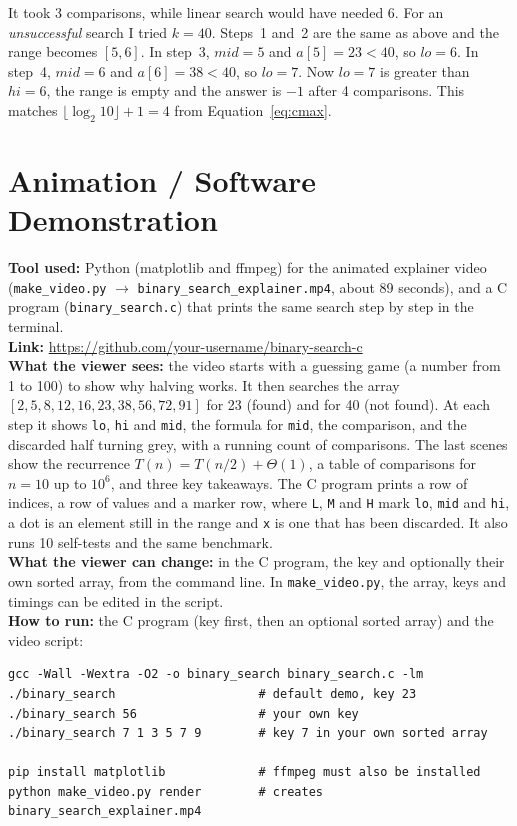 \documentclass[11pt,a4paper]{article}
\newcommand{\animationlink}{https://github.com/your-username/binary-search-c}
\newif\ifshowguidance
\newcommand{\guidance}[1]{\ifshowguidance\begin{guidancebox}#1\end{guidancebox}\fi}
\begin{document}
It took 3 comparisons, while linear search would have needed 6. For an
\emph{unsuccessful} search I tried $k=40$. Steps~1 and~2 are the same as above
and the range becomes $[5,6]$. In step~3, $\mathit{mid}=5$ and $a[5]=23<40$, so
$\mathit{lo}=6$. In step~4, $\mathit{mid}=6$ and $a[6]=38<40$, so
$\mathit{lo}=7$. Now $\mathit{lo}=7$ is greater than $\mathit{hi}=6$, the range is
empty and the answer is $-1$ after 4 comparisons. This matches
$\lfloor\log_2 10\rfloor+1=4$ from Equation~\eqref{eq:cmax}.

\section{Animation / Software Demonstration}
\guidance{Compulsory: tool, link, how to run, 3--4 key frames.}

\textbf{Tool used:} Python (matplotlib and ffmpeg) for the animated explainer video
(\texttt{make\_video.py} $\rightarrow$ \texttt{binary\_search\_explainer.mp4}, about
89 seconds), and a C program (\texttt{binary\_search.c}) that prints the same search
step by step in the terminal.\\
\textbf{Link:} \url{\animationlink}\\
\textbf{What the viewer sees:} the video starts with a guessing game (a number from
1 to 100) to show why halving works. It then searches the array
$[2,5,8,12,16,23,38,56,72,91]$ for 23 (found) and for 40 (not found). At each step
it shows \texttt{lo}, \texttt{hi} and \texttt{mid}, the formula for \texttt{mid},
the comparison, and the discarded half turning grey, with a running count of
comparisons. The last scenes show the recurrence $T(n)=T(n/2)+\Theta(1)$, a table
of comparisons for $n=10$ up to $10^6$, and three key takeaways. The C program
prints a row of indices, a row of values and a marker row, where \texttt{L},
\texttt{M} and \texttt{H} mark \texttt{lo}, \texttt{mid} and \texttt{hi}, a dot is an
element still in the range and \texttt{x} is one that has been discarded. It also
runs 10 self-tests and the same benchmark.\\
\textbf{What the viewer can change:} in the C program, the key and optionally their
own sorted array, from the command line. In \texttt{make\_video.py}, the array, keys
and timings can be edited in the script.\\
\textbf{How to run:} the C program (key first, then an optional sorted array) and the
video script:
\begin{lstlisting}[numbers=none,basicstyle=\ttfamily\footnotesize]
gcc -Wall -Wextra -O2 -o binary_search binary_search.c -lm
./binary_search                    # default demo, key 23
./binary_search 56                 # your own key
./binary_search 7 1 3 5 7 9        # key 7 in your own sorted array

pip install matplotlib             # ffmpeg must also be installed
python make_video.py render        # creates binary_search_explainer.mp4
\end{lstlisting}
\end{document}

